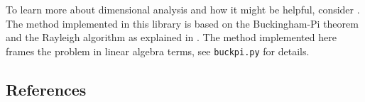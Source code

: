 \documentclass[11pt]{article}
\begin{document}
To learn more about dimensional analysis and how it might be helpful, consider \cite{szirtes2007applied, santiago2019first, sonin2001dimensional, lemons2017student,schetz1999fundamentals}. The method implemented in this library is based on the Buckingham-Pi theorem and the Rayleigh algorithm as explained in \cite{szirtes2007applied}. The method implemented here frames the problem in linear algebra terms, see \texttt{buckpi.py} for details.

\subsection{References}

\begingroup
\renewcommand{\section}[2]{}%

\endgroup
\end{document}
